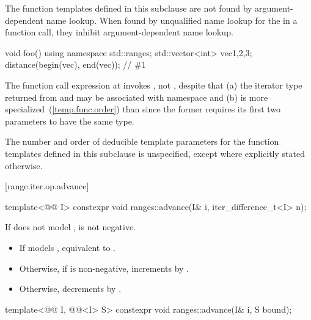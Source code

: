 \pnum
The function templates defined in this subclause are not found by
argument-dependent name lookup. When found by
unqualified name lookup for the
 in a function call, they
inhibit argument-dependent name lookup.

\begin{example}
\begin{codeblock}
void foo() {
    using namespace std::ranges;
    std::vector<int> vec{1,2,3};
    distance(begin(vec), end(vec));     // \#1
}
\end{codeblock}
The function call expression at  invokes ,
not , despite that
(a) the iterator type returned from  and 
may be associated with namespace  and
(b)  is more specialized~(\ref{temp.func.order}) than
 since the former requires its first two parameters
to have the same type.
\end{example}

\pnum
The number and order of deducible template parameters for the function templates defined
in this subclause is unspecified, except where explicitly stated otherwise.

[range.iter.op.advance]{}

%
\begin{itemdecl}
template<@@ I>
  constexpr void ranges::advance(I& i, iter_difference_t<I> n);
\end{itemdecl}

\begin{itemdescr}
\pnum
\expects
If  does not model ,
 is not negative.

\pnum
\effects
\begin{itemize}
\item If  models ,
  equivalent to .
\item Otherwise, if  is non-negative, increments
   by .
\item Otherwise, decrements  by .
\end{itemize}
\end{itemdescr}

%
\begin{itemdecl}
template<@@ I, @@<I> S>
  constexpr void ranges::advance(I& i, S bound);
\end{itemdecl}

